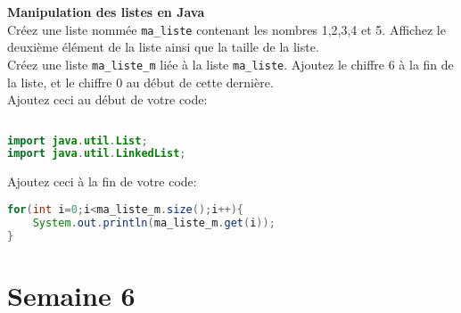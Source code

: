  \begin{Exercice}[10 minutes] \textbf{Manipulation des listes en Java}\\
      	Créez une liste nommée \lstinline{ma_liste} contenant les nombres 1,2,3,4 et 5. Affichez le deuxième élément de la liste ainsi que la taille de la liste. \\
      	
      	Créez une liste \lstinline{ma_liste_m} liée à la liste \lstinline{ma_liste}. Ajoutez le chiffre 6 à la fin de la liste, et le chiffre 0 au début de cette dernière. \\
      	
      	Ajoutez ceci au début de votre code:
      	\begin{lstlisting}[language=Java]
             
import java.util.List;
import java.util.LinkedList; \end{lstlisting}
	     
	     Ajoutez ceci à la fin de votre code:
	     
	    \begin{lstlisting}[language=Java]
for(int i=0;i<ma_liste_m.size();i++){
	System.out.println(ma_liste_m.get(i));
} \end{lstlisting} 
    
\end{Exercice}


\section*{Semaine 6}       

